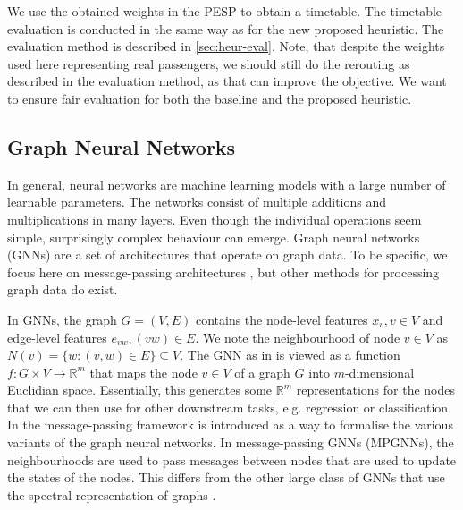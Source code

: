\documentclass[english, 12pt, a4paper, sci, utf8, a-2b, online]{aaltothesis}
\newcommand{\R}{\mathbb{R}}
\begin{document}
We use the obtained weights in the PESP to obtain a timetable. The timetable evaluation is conducted in the same way as for the new proposed heuristic. The evaluation method is described in \cref{sec:heur-eval}. Note, that despite the weights used here representing real passengers, we should still do the rerouting as described in the evaluation method, as that can improve the objective. We want to ensure fair evaluation for both the baseline and the proposed heuristic.



\subsection{Graph Neural Networks}
\label{sec:gnns}

In general, neural networks are machine learning models with a large number of learnable parameters. The networks consist of multiple additions and multiplications in many layers. Even though the individual operations seem simple, surprisingly complex behaviour can emerge. Graph neural networks (GNNs) are a set of architectures that operate on graph data. To be specific, we focus here on message-passing architectures \cite{mpgnn-into-2017}, but other methods for processing graph data do exist.

In GNNs, the graph $G = (V, E)$ contains the node-level features $x_v, v\in V$ and edge-level features $e_{vw}, (vw) \in E$. We note the neighbourhood of node $v \in V$ as $N(v) = \{w : (v, w) \in E\}\subseteq V$. 
The GNN as in \cite{gnn-intro-2009} is viewed as a function $f:G \times V \to \R^m$ that maps the node $v \in V$ of a graph $G$ into $m$-dimensional Euclidian space. Essentially, this generates some $\R^m$ representations for the nodes that we can then use for other downstream tasks, e.g. regression or classification. In \cite{mpgnn-into-2017} the message-passing framework is introduced as a way to formalise the various variants of the graph neural networks.
In message-passing GNNs (MPGNNs), the neighbourhoods are used to pass messages between nodes that are used to update the states of the nodes. This differs from the other large class of GNNs that use the spectral representation of graphs \cite{gnn-review-2020}.
\end{document}
